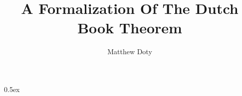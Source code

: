 \documentclass[11pt,a4paper]{report}
\begin{document}
\title{A Formalization Of The Dutch Book Theorem}
\author{Matthew Doty}

\maketitle

\tableofcontents

\newpage

\parindent 0pt\parskip 0.5ex






\end{document}
